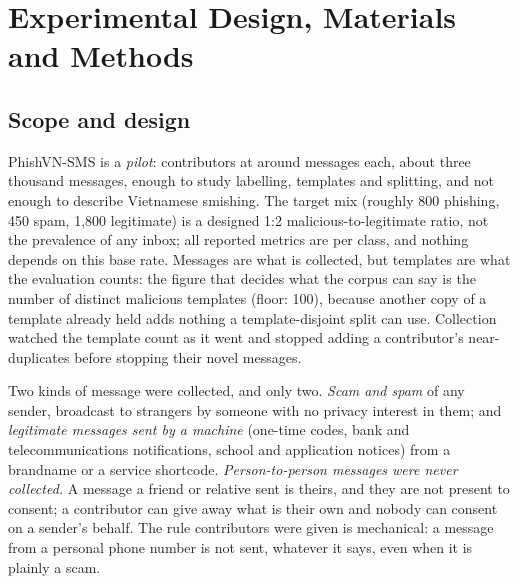 \section*{Experimental Design, Materials and Methods}

\subsection*{Scope and design}
PhishVN-SMS is a \emph{pilot}:  contributors at around  messages each,
about three thousand messages, enough to study labelling, templates and splitting, and not
enough to describe Vietnamese smishing. The target mix (roughly 800 phishing, 450 spam, 1{,}800
legitimate) is a designed 1:2 malicious-to-legitimate ratio, not the prevalence of any inbox;
all reported metrics are per class, and nothing depends on this base rate. Messages are what is
collected, but templates are what the evaluation counts: the figure that decides what the corpus
can say is the number of distinct malicious templates (floor: 100), because another copy of a
template already held adds nothing a template-disjoint split can use. Collection watched the
template count as it went and stopped adding a contributor's near-duplicates before stopping
their novel messages.

Two kinds of message were collected, and only two. \emph{Scam and spam} of any sender,
broadcast to strangers by someone with no privacy interest in them; and \emph{legitimate
messages sent by a machine} (one-time codes, bank and telecommunications notifications, school
and application notices) from a brandname or a service shortcode. \emph{Person-to-person
messages were never collected.} A message a friend or relative sent is theirs, and they are not
present to consent; a contributor can give away what is their own and nobody can consent on a
sender's behalf. The rule contributors were given is mechanical: a message from a personal phone
number is not sent, whatever it says, even when it is plainly a scam.


